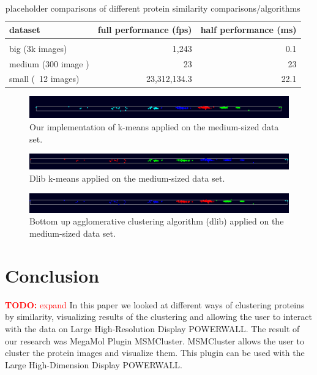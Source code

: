 \documentclass[journal]{vgtc}       %
\newcommand{\todo}[1]{\textcolor{red}{\textbf{TODO:} #1}}
\begin{document}
\begin{table}[!h]
  \caption{
  \label{tab:perf} placeholder comparisons of different protein similarity comparisons/algorithms}
  \centering
  \vspace{0.3em}
  \begin{tabular}{lrr}
  dataset & full performance (fps) & half performance (ms)\\ \hline\\[-0.4em]
  big (3k images) & 1,243 & 0.1 \\
  medium (300 image ) & 23 & 23 \\
  small (~12 images) & 23,312,134.3 & 22.1 \\
  \end{tabular}
  \end{table}

\begin{figure}[h!]
	\begin{center}
		\includegraphics[width=.75\linewidth]{k-Means-mediumDataSet.png}
	\end{center}
	\caption{\label{fig:kmeans} Our implementation of k-means applied on the medium-sized data set.}
\end{figure} 
\begin{figure}[h!]
	\begin{center}
		\includegraphics[width=.75\linewidth]{k-Means-dlib-mediumDataSet.png}
	\end{center}
	\caption{\label{fig:kmeans-dlib} Dlib k-means applied on the medium-sized data set.}
\end{figure}
\begin{figure}[h!]
	\begin{center}
		\includegraphics[width=.75\linewidth]{bottomUpAgglomerative-mediumDataSet.png}
	\end{center}
	\caption{\label{fig:bottomUpAgglomerative} Bottom up agglomerative clustering algorithm (dlib) applied on the medium-sized data set.}
\end{figure}


\section{Conclusion}
\todo{expand}
In this paper we looked at different ways of clustering proteins by similarity, visualizing results of the clustering and allowing the user to interact with the data on Large High-Resolution Display POWERWALL. The result of our research was MegaMol Plugin MSMCluster. MSMCluster allows the user to cluster the protein images and visualize them. This plugin can be used with the Large High-Dimension Display POWERWALL. 
\end{document}

